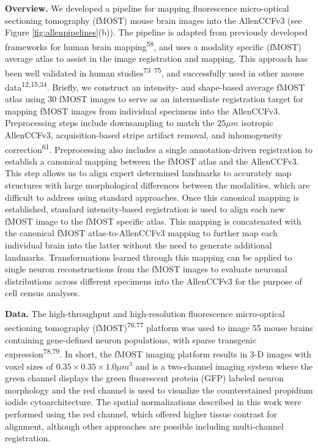 \documentclass[
  12pt,
]{article}
\begin{document}
\textbf{Overview.} We developed a pipeline for mapping fluorescence
micro-optical sectioning tomography (fMOST) mouse brain images into the
AllenCCFv3 (see Figure \ref{fig:allenpipelines}(b)). The pipeline is
adapted from previously developed frameworks for human brain
mapping\textsuperscript{58}, and uses a modality specific (fMOST)
average atlas to assist in the image registration and mapping. This
approach has been well validated in human
studies\textsuperscript{73--75}, and successfully used in other mouse
data\textsuperscript{12,15,34}. Briefly, we construct an intensity- and
shape-based average fMOST atlas using 30 fMOST images to serve as an
intermediate registration target for mapping fMOST images from
individual specimens into the AllenCCFv3. Preprocessing steps include
downsampling to match the \(25 \mu m\) isotropic AllenCCFv3,
acquisition-based stripe artifact removal, and inhomogeneity
correction\textsuperscript{61}. Preprocessing also includes a single
annotation-driven registration to establish a canonical mapping between
the fMOST atlas and the AllenCCFv3. This step allows us to align expert
determined landmarks to accurately map structures with large
morphological differences between the modalities, which are difficult to
address using standard approaches. Once this canonical mapping is
established, standard intensity-based registration is used to align each
new fMOST image to the fMOST specific atlas. This mapping is
concatenated with the canonical fMOST atlas-to-AllenCCFv3 mapping to
further map each individual brain into the latter without the need to
generate additional landmarks. Transformations learned through this
mapping can be applied to single neuron reconstructions from the fMOST
images to evaluate neuronal distributions across different specimens
into the AllenCCFv3 for the purpose of cell census analyses.

\textbf{Data.} The high-throughput and high-resolution fluorescence
micro-optical sectioning tomography (fMOST)\textsuperscript{76,77}
platform was used to image 55 mouse brains containing gene-defined
neuron populations, with sparse transgenic
expression\textsuperscript{78,79}. In short, the fMOST imaging platform
results in 3-D images with voxel sizes of \(0.35 \times 0.35 \times 1.0
\mu m^3\) and is a two-channel imaging system where the green channel
displays the green fluorescent protein (GFP) labeled neuron morphology
and the red channel is used to visualize the counterstained propidium
iodide cytoarchitecture. The spatial normalizations described in this
work were performed using the red channel, which offered higher tissue
contrast for alignment, although other approaches are possible including
multi-channel registration.
\end{document}
